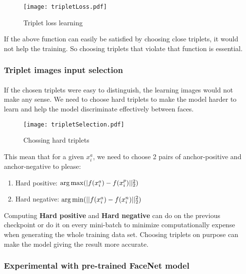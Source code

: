 \begin{figure}[H]
    \centering
    \texttt{[image: tripletLoss.pdf]}
    \caption{Triplet loss learning}
\end{figure}

If the above function can easily be satisfied by choosing close triplets, it would not help the training. So choosing triplets that violate that function is essential.

\subsubsection{Triplet images input selection}
\paragraph{}
If the chosen triplets were easy to distinguish, the learning images would not make any sense. We need to choose hard triplets to make the model harder to learn and help the model discriminate effectively between faces.

\begin{figure}
    \centering
    \texttt{[image: tripletSelection.pdf]}
    \caption{Chossing hard triplets}
\end{figure}

This mean that for a given $x^a_i$, we need to choose 2 pairs of anchor-positive and anchor-negative to please:
\begin{enumerate}
    \item Hard positive: $\operatorname*{arg\,max}(|f(x^a_i) - f(x^p_i)||^2_2)$
    \item Hard negative: $\operatorname*{arg\,min}(||f(x^a_i) - f(x^n_i)||^2_2)$
\end{enumerate}

Computing \textbf{Hard positive} and \textbf{Hard negative} can do on the previous checkpoint or do it on every mini-batch to minimize computationally expense when generating the whole training data set. Choosing triplets on purpose can make the model giving the result more accurate. 

\subsubsection{Experimental with pre-trained FaceNet model}
